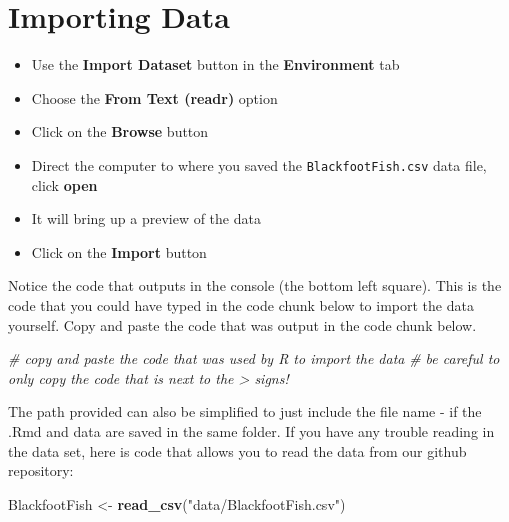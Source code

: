 \documentclass[
  10pt,
  letterpaper,
  twoside,
  openright]{book}
\newenvironment{Shaded}{\begin{snugshade}}{\end{snugshade}}
\newcommand{\CommentTok}[1]{\textcolor[rgb]{0.56,0.35,0.01}{\textit{#1}}}
\newcommand{\FunctionTok}[1]{\textcolor[rgb]{0.13,0.29,0.53}{\textbf{#1}}}
\newcommand{\NormalTok}[1]{#1}
\newcommand{\OtherTok}[1]{\textcolor[rgb]{0.56,0.35,0.01}{#1}}
\newcommand{\StringTok}[1]{\textcolor[rgb]{0.31,0.60,0.02}{#1}}
\providecommand{\tightlist}{%
  \setlength{\itemsep}{0pt}\setlength{\parskip}{0pt}}
\begin{document}
\hypertarget{importing-data}{%
\section{Importing Data}\label{importing-data}}

\begin{itemize}
\tightlist
\item
  Use the \textbf{Import Dataset} button in the \textbf{Environment}
  tab\\
\item
  Choose the \textbf{From Text (readr)} option\\
\item
  Click on the \textbf{Browse} button\\
\item
  Direct the computer to where you saved the \texttt{BlackfootFish.csv}
  data file, click \textbf{open}\\
\item
  It will bring up a preview of the data\\
\item
  Click on the \textbf{Import} button
\end{itemize}

Notice the code that outputs in the console (the bottom left square).
This is the code that you could have typed in the code chunk below to
import the data yourself. Copy and paste the code that was output in the
code chunk below.

\begin{Shaded}
\begin{Highlighting}[]
\CommentTok{\# copy and paste the code that was used by R to import the data }
\CommentTok{\# be careful to only copy the code that is next to the \textgreater{} signs! }
\end{Highlighting}
\end{Shaded}

The path provided can also be simplified to just include the file name -
if the .Rmd and data are saved in the same folder. If you have any
trouble reading in the data set, here is code that allows you to read
the data from our github repository:

\begin{Shaded}
\begin{Highlighting}[]
\NormalTok{BlackfootFish }\OtherTok{\textless{}{-}} \FunctionTok{read\_csv}\NormalTok{(}\StringTok{"data/BlackfootFish.csv"}\NormalTok{)}
\end{Highlighting}
\end{Shaded}
\end{document}
